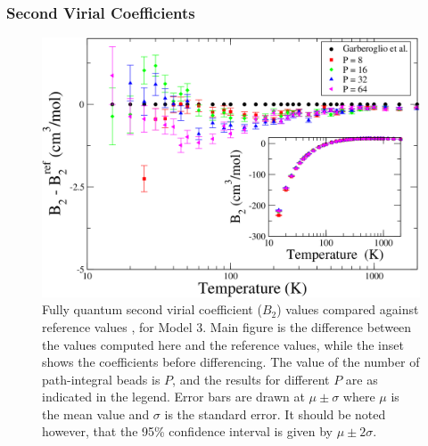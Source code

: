             \subsubsection{Second Virial Coefficients}
                \begin{figure}[!htbp]
                    \centering
                    \includegraphics[scale=0.20,keepaspectratio]{Chapter-4/Figures/s3GarberoglioAll.png}
                    \caption{Fully quantum second virial coefficient ($B_2$) values compared against reference values \cite{Garberoglio2014}, for Model 3. Main figure is the difference between the values computed here and the reference values, while the inset shows the coefficients before differencing. The value of the number of path-integral beads is $P$, and the results for different $P$ are as indicated in the legend. Error bars are drawn at $\mu \pm \sigma$ where $\mu$ is the mean value and $\sigma$ is the standard error. It should be noted however, that the 95\% confidence interval is given by $\mu \pm 2\sigma$.}
                    \label{fig:variable}
                \end{figure}

